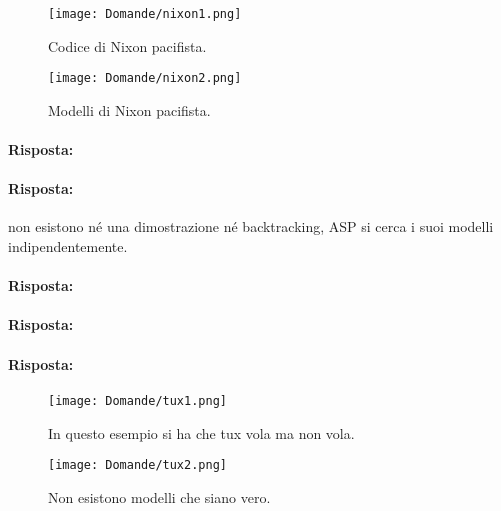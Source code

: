 
\begin{figure}[h]
    \centering
    \begin{minipage}{0.45\textwidth}
        \centering
        \texttt{[image: Domande/nixon1.png]}
        \caption{Codice di Nixon pacifista.}
    \end{minipage}
    \hfill
    \begin{minipage}{0.45\textwidth}
        \centering
        \texttt{[image: Domande/nixon2.png]}
        \caption{Modelli di Nixon pacifista.}
    \end{minipage}
\end{figure}



\paragraph{Risposta:}


\paragraph{Risposta:} non esistono né una dimostrazione né backtracking, ASP si cerca i suoi modelli indipendentemente.


\paragraph{Risposta:}


\paragraph{Risposta:}


\paragraph{Risposta:}


\begin{figure}[h]
    \centering
    \begin{minipage}{0.45\textwidth}
        \centering
        \texttt{[image: Domande/tux1.png]}
        \caption{In questo esempio si ha che tux vola ma non vola.}
    \end{minipage}
    \hfill
    \begin{minipage}{0.45\textwidth}
        \centering
        \texttt{[image: Domande/tux2.png]}
        \caption{Non esistono modelli che siano vero.}
    \end{minipage}
\end{figure}


